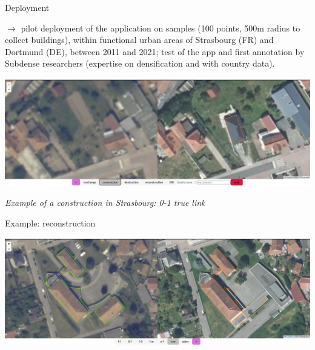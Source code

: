 \documentclass{beamer}
\begin{document}
\begin{frame}{Deployment}


$\rightarrow$ pilot deployment of the application on samples (100 points, 500m radius to collect buildings), within functional urban areas of Strasbourg (FR) and Dortmund (DE), between 2011 and 2021; test of the app and first annotation by Subdense researchers (expertise on densification and with country data).

\medskip

\begin{center}
	\includegraphics[width=\linewidth]{figures/example_construction.png}
\end{center}

\textit{Example of a construction in Strasbourg: 0-1 true link}




\end{frame}


\begin{frame}{Example: reconstruction}
\begin{center}
	\includegraphics[width=\linewidth]{figures/example_reconstruction.png}
\end{center}
\end{frame}
\end{document}
